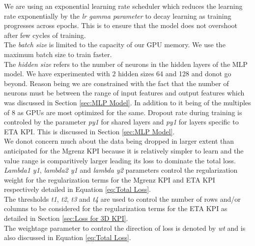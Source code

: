 \documentclass{report} %
\begin{document}
We are using an exponential learning rate scheduler which reduces the learning rate exponentially by the \textit{lr gamma parameter} to decay learning as training progresses across epochs.
This is to ensure that the model does not overshoot after few cycles of training.\\
The \textit{batch size} is limited to the capacity of our \ac{GPU} memory. We use the maximum batch size to train faster.\\
The \textit{hidden size} refers to the number of neurons in the hidden layers of the \ac{MLP} model. 
We have experimented with 2 hidden sizes 64 and 128 and donot go beyond.
Reason being we are constrained with the fact that the number of neurons must be between the range of input features and output features which was discussed in Section \ref{sec:MLP Model}.
In addition to it being of the multiples of 8 as \ac{GPU}s are most optimized for the same.
Dropout rate during training is controled by the parameter \textit{py1} for shared layers and \textit{py1} for layers specific to ETA \ac{KPI}. This is discussed in Section \ref{sec:MLP Model}. \\
We donot concern much about the data being dropped in larger extent than anticipated for the Mgrenz \ac{KPI} because it is relatively simpler to learn and the value range is comparitively larger leading its loss to dominate the total loss.\\
\textit{Lambda1 y1}, \textit{lambda2 y1} and \textit{lambda y2} parameters control the regularization weight for the regularization terms for the Mgrenz \ac{KPI} and ETA \ac{KPI} respectively detailed in Equation \ref{eq:Total Loss}.\\
The thresholds \textit{t1}, \textit{t2}, \textit{t3} and \textit{t4} are used to control the number of rows and/or columns to be considered for the regularization terms for the ETA \ac{KPI} as detailed in Section \ref{sec:Loss for 3D KPI}.\\
The weightage parameter to control the direction of loss is denoted by \textit{wt} and is also discussed in Equation \ref{eq:Total Loss}.\\
\end{document}
